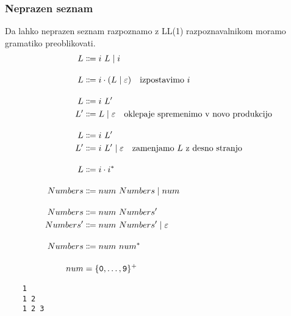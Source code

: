 \documentclass{report}
\newcommand{\Null}{\varepsilon}
\newcommand{\Char}[1]{\texttt{#1}}
\newcommand{\Seq}{\cdot}
\newcommand{\Spc}{\ }
\newcommand{\Union}{\mathrel{|}}
\newcommand{\Kleene}[1]{{#1}^\ast}
\newcommand{\KleenePlus}[1]{#1^+}
\newcommand{\Arrow}{\Coloneq}
\newcommand{\NT}[1]{{#1}}
\newcommand{\T}[1]{{#1}}
\begin{document}
    \subsubsection{Neprazen seznam}
    Da lahko neprazen seznam razpoznamo z LL(1) razpoznavalnikom moramo gramatiko preoblikovati.
    \begin{equation*}
      \begin{aligned}[t]
        \NT{L} &\Arrow \T{i} \Spc \NT{L} \Union \T{i}\\[1em]
        \NT{L} &\Arrow \T{i} \Seq (\NT{L} \Union \Null)\text{\quad izpostavimo $\T{i}$}\\[1em]
        \NT{L} &\Arrow \T{i} \Spc \NT{L'}\\
        \NT{L'} &\Arrow \NT{L} \Union \Null \text{\quad oklepaje spremenimo v novo produkcijo}\\[1em]
        \NT{L} &\Arrow \T{i} \Spc \NT{L'}\\
        \NT{L'} &\Arrow \T{i} \Spc \NT{L'} \Union \Null \text{\quad zamenjamo $\NT{L}$ z desno stranjo}\\[1em]
        \NT{L} &\Arrow \T{i} \Seq \Kleene{\T{i}}\\[1em]
        \NT{Numbers} &\Arrow \T{num} \Spc \NT{Numbers} \Union \T{num}\\[1em]
        \NT{Numbers} &\Arrow \T{num} \Spc \NT{Numbers'}\\
        \NT{Numbers'} &\Arrow \T{num} \Spc \NT{Numbers'} \Union \Null\\[1em]
        \NT{Numbers} &\Arrow \T{num} \Spc \Kleene{\T{num}}\\[1em]
        \T{num} &= \KleenePlus{\{\Char{0}, \dots, \Char{9}\}}
      \end{aligned}
    \end{equation*}
    \begin{lstlisting}
    1
    1 2
    1 2 3
    \end{lstlisting}
\end{document}
